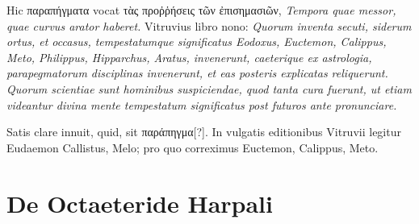 Hic \textgreek{παραπήγματα} vocat \textgreek{τὰς
προῤῥήσεις τῶν ἐπισημασιῶν}, \textit{Tempora quae
messor, quae curvus arator haberet.}
Vitruvius libro nono: \textit{Quorum inventa
secuti, siderum ortus, et occasus, tempestatumque
significatus Eodoxus,
Euctemon, Calippus, Meto, Philippus,
Hipparchus, Aratus, invenerunt,
caeterique ex astrologia, parapegmatorum
disciplinas invenerunt, et
eas posteris explicatas reliquerunt.}
\textit{Quorum
scientiae sunt hominibus suspiciendae,
quod tanta cura fuerunt, ut etiam videantur divina mente tempestatum
significatus post futuros ante pronunciare.}

Satis clare innuit,
quid, sit \textgreek{παράπηγμα[?]}.
In vulgatis editionibus Vitruvii legitur Eudaemon
Callistus, Melo; pro quo correximus Euctemon, Calippus,
Meto.

\section{De Octaeteride Harpali}

